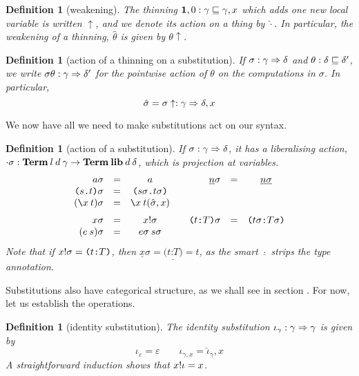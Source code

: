 \documentclass{jfp1}
\newtheorem{definition}[theorem]{Definition}
\newcommand{\emp}{\varepsilon}
\newcommand{\Pa}[1]{\texttt{(}#1\texttt{)}}
\newcommand{\dt}{\texttt{.}}
\newcommand{\cn}[2]{\Pa{#1 \dt #2}}
\newcommand{\hb}{\texttt{:}}
\newcommand{\ra}[2]{\Pa{#1 \hb #2}}
\newcommand{\Ne}{\underline}
\begin{document}
\newcommand{\wk}{\uparrow}
\newcommand{\wka}{\hat}
\begin{definition}[weakening]
  The thinning $\mathbf{1},0 : \gamma\sqsubseteq\gamma,x$ which adds one new local variable is written
  $\wk$, and we denote its action on a thing by $\wka\cdot$. In particular, the weakening
  of a thinning, $\wka\theta$ is given by $\theta\wk$.
\end{definition}

\begin{definition}[action of a thinning on a substitution]
  If $\sigma:\gamma\Rightarrow\delta$ and $\theta:\delta\sqsubseteq\delta'$, we
  write $\sigma\theta:\gamma\Rightarrow\delta'$ for the pointwise action of
  $\theta$ on the computations in $\sigma$. In particular,
  \[
    \wka\sigma = \sigma\wk : \gamma\su\delta,x
    \]
\end{definition}

We now have all we need to make substitutions act on our syntax.

\begin{definition}[action of a substitution]
  If $\sigma:\gamma\Rightarrow \delta$, it has a liberalising action,
  $\cdot\sigma:\mathbf{Term}\:l\:d\:\gamma\to\mathbf{Term}\:\textbf{lib}\:d\:\delta$, which is projection
  at variables.
  \[
    \begin{array}{rlc@{\qquad}rlc}
      a\sigma & = & a & \Ne n\sigma & = & \Ne{n\sigma} \\
      \cn st\sigma & = & \cn{s\sigma}{t\sigma} && \\
      (\la x t)\sigma & = & \la x t(\wka\sigma,x) && \medskip\\
      x\sigma & = & \sel x\sigma    & \ra tT\sigma & = & \ra{t\sigma}{T\sigma} \\
      (e\:s)\sigma & = & e\sigma\:s\sigma
    \end{array}
  \]
  Note that if $\sel x\sigma = \ra tT$, then $\Ne x\sigma = \Ne{\ra tT} =
  t$, as the smart $\Ne\cdot$ strips the type annotation.
\end{definition}

Substitutions also have categorical structure, as we shall see in
section \label{sec:sbstcat}. For now, let us establish the operations.

\newcommand{\isu}{\iota}
\begin{definition}[identity substitution]
  The identity substitution $\isu_\gamma : \gamma\su\gamma$ is given by
  \[\isu_\emp = \emp \qquad \isu_{\gamma,x} = \wka\isu_\gamma,x
  \]
  A straightforward induction shows that $\sel x\isu = x$.
\end{definition}
\end{document}

